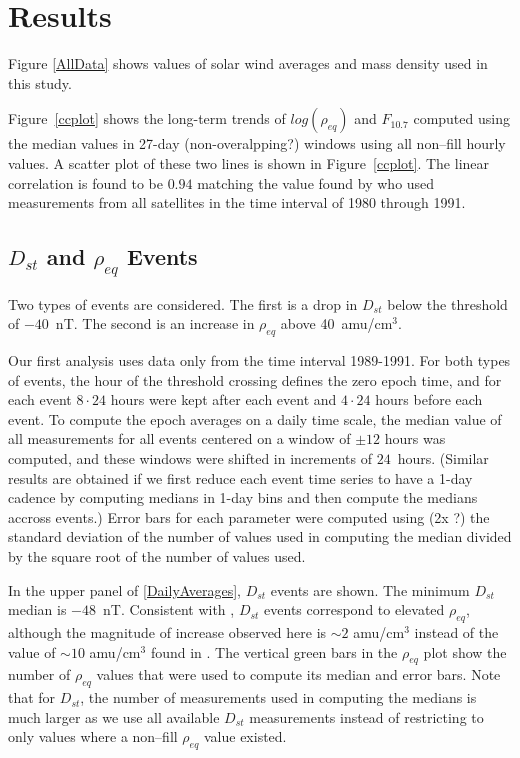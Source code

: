 \documentclass[10pt,twocolumn]{article}
\begin{document}

\section{Results}
Figure \ref{AllData} shows values of solar wind averages and mass density used in this study.  

Figure~\ref{ccplot} shows the long-term trends of $log(\rho_{eq})$ and $F_{10.7}$ computed using the median values in 27-day (non-overalpping?) windows using all non--fill hourly values.  A scatter plot of these two lines is shown in Figure~\ref{ccplot}.  The linear correlation is found to be $0.94$ matching the value found by \cite{Takahashi2010} who used measurements from all satellites in the time interval of 1980 through 1991.

\subsection{$D_{st}$ and $\rho_{eq}$ Events}

Two types of events are considered. The first is a drop in $D_{st}$ below the threshold of $-40$~nT.  The second is an increase in $\rho_{eq}$ above 40~amu/cm$^3$.

Our first analysis uses data only from the time interval 1989-1991. For both types of events, the hour of the threshold crossing defines the zero epoch time, and for each event $8\cdot24$ hours were kept after each event and $4\cdot24$ hours before each event.  To compute the epoch averages on a daily time scale, the median value of all measurements for all events centered on a window of $\pm 12$ hours was computed, and these windows were shifted in increments of $24$~hours. (Similar results are obtained if we first reduce each event time series to have a 1-day cadence by computing medians in 1-day bins and then compute the medians accross events.)  Error bars for each parameter were computed using (2x ?) the standard deviation of the number of values used in computing the median divided by the square root of the number of values used.

In the upper panel of \ref{DailyAverages}, $D_{st}$ events are shown.  The minimum $D_{st}$ median is $-48$~nT.  Consistent with \cite{Takahashi2010}, $D_{st}$ events correspond to elevated $\rho_{eq}$, although the magnitude of increase observed here is $\sim 2$ amu/cm$^3$ instead of the value of $\sim 10$ amu/cm$^3$ found in \cite{Takahashi2010}.  The vertical green bars in the $\rho_{eq}$ plot show the number of $\rho_{eq}$ values that were used to compute its median and error bars.  Note that for $D_{st}$, the number of measurements used in computing the medians is much larger as we use all available $D_{st}$ measurements instead of restricting to only values where a non--fill $\rho_{eq}$ value existed.  
\end{document}
